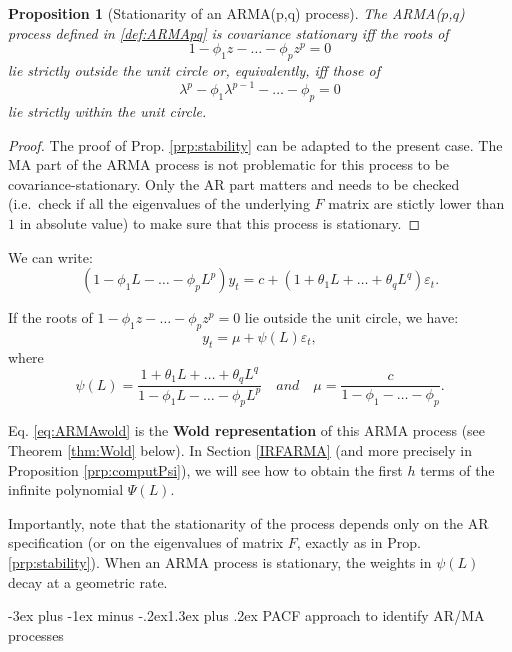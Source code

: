 \documentclass[
  11pt,
]{book}
\makeatletter
\renewcommand\section{\@startsection{section}{1}{\z@}
  {-3ex plus -1ex minus -.2ex}{1.3ex plus .2ex}
  {\normalfont\Large\bfseries\color{TextbookInk}}}
\newtheorem{proposition}{Proposition}[chapter]
\theoremstyle{definition}
\theoremstyle{definition}
\theoremstyle{definition}
\theoremstyle{definition}
\theoremstyle{remark}
\makeatother
\begin{document}
\begin{proposition}[Stationarity of an ARMA(p,q) process]
\protect\hypertarget{prp:statioARMApq}{}\label{prp:statioARMApq}The ARMA(\(p\),\(q\)) process defined in \ref{def:ARMApq} is covariance stationary iff the roots of
\[
1 - \phi_1 z - \dots - \phi_p z^p=0
\]
lie strictly outside the unit circle or, equivalently, iff those of
\[
\lambda^p - \phi_1 \lambda^{p-1} - \dots - \phi_p=0
\]
lie strictly within the unit circle.
\end{proposition}

\begin{proof}
The proof of Prop. \ref{prp:stability} can be adapted to the present case. The MA part of the ARMA process is not problematic for this process to be covariance-stationary. Only the AR part matters and needs to be checked (i.e.~check if all the eigenvalues of the underlying \(F\) matrix are stictly lower than \(1\) in absolute value) to make sure that this process is stationary.
\end{proof}

We can write:
\[
(1 - \phi_1 L - \dots - \phi_p L^p)y_t = c + (1 + \theta_1 L + \dots + \theta_q L^q)\varepsilon_t.
\]

If the roots of \(1 - \phi_1 z - \dots - \phi_p z^p=0\) lie outside the unit circle, we have:
\begin{equation}
y_t = \mu + \psi(L)\varepsilon_t,\label{eq:ARMAwold}
\end{equation}
where
\[
\psi(L) = \frac{1 + \theta_1 L + \dots + \theta_q L^q}{1 - \phi_1 L - \dots - \phi_p L^p} \quad and \quad \mu = \dfrac{c}{1-\phi_1 -\dots - \phi_p}.
\]

Eq. \eqref{eq:ARMAwold} is the \textbf{Wold representation} of this ARMA process (see Theorem \ref{thm:Wold} below). In Section \ref{IRFARMA} (and more precisely in Proposition \ref{prp:computPsi}), we will see how to obtain the first \(h\) terms of the infinite polynomial \(\Psi(L)\).

Importantly, note that the stationarity of the process depends only on the AR specification (or on the eigenvalues of matrix \(F\), exactly as in Prop. \ref{prp:stability}). When an ARMA process is stationary, the weights in \(\psi(L)\) decay at a geometric rate.

\section{PACF approach to identify AR/MA processes}\label{PACFapproach}
\end{document}
